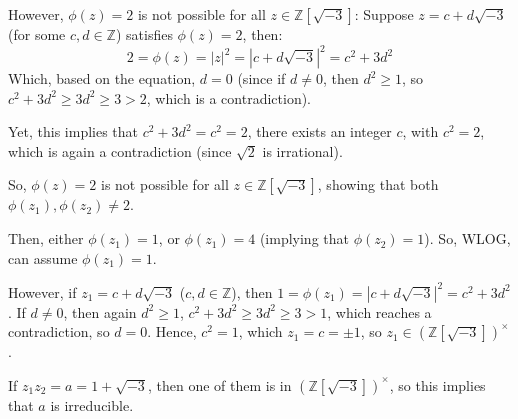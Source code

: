 \documentclass{article}
\begin{document}
However, $\phi(z)=2$ is not possible for all $z\in\mathbb{Z}[\sqrt{-3}]$: Suppose $z=c+d\sqrt{-3}$ (for some $c,d\in\mathbb{Z}$) satisfies $\phi(z)=2$, then:
$$2=\phi(z)=|z|^2=|c+d\sqrt{-3}|^2=c^2+3d^2$$
Which, based on the equation, $d=0$ (since if $d\neq 0$, then $d^2 \geq 1$, so $c^2+3d^2\geq 3d^2\geq 3 > 2$, which is a contradiction).

Yet, this implies that $c^2+3d^2=c^2=2$, there exists an integer $c$, with $c^2=2$, which is again a contradiction (since $\sqrt{2}$ is irrational).

So, $\phi(z)=2$ is not possible for all $z\in\mathbb{Z}[\sqrt{-3}]$, showing that both $\phi(z_1),\phi(z_2)\neq 2$.

\hfill

Then, either $\phi(z_1)=1$, or $\phi(z_1)=4$ (implying that $\phi(z_2)=1$). So, WLOG, can assume $\phi(z_1)=1$.

\hfill

However, if $z_1=c+d\sqrt{-3}$ ($c,d\in\mathbb{Z}$), then $1=\phi(z_1)=|c+d\sqrt{-3}|^2=c^2+3d^2$.
If $d\neq 0$, then again $d^2\geq 1$, $c^2+3d^2\geq 3d^2\geq 3 > 1$, which reaches a contradiction, so $d=0$.
Hence, $c^2=1$, which $z_1=c=\pm 1$, so $z_1\in(\mathbb{Z}[\sqrt{-3}])^\times$. 

If $z_1z_2=a=1+\sqrt{-3}$, then one of them is in $(\mathbb{Z}[\sqrt{-3}])^\times$, so this implies that $a$ is irreducible.
\end{document}

